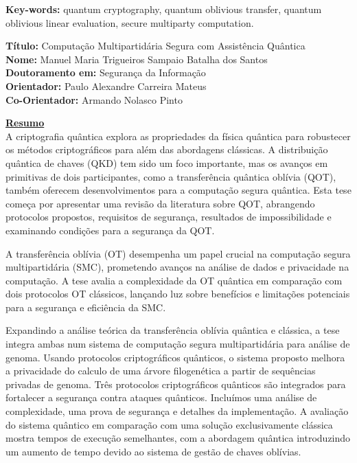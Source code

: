 \documentclass[12pt]{report}
\begin{document}
\vfill

\begin{flushleft}
\textbf{Key-words:} quantum cryptography, quantum oblivious transfer, quantum oblivious
linear evaluation, secure multiparty computation.
\end{flushleft}


\newpage


\noindent \textbf{T\'{i}tulo:} Computa\c{c}\~{a}o Multipartid\'{a}ria Segura com Assist\^{e}ncia Qu\^{a}ntica\\
\textbf{Nome:} Manuel Maria Trigueiros Sampaio Batalha dos Santos\\
\textbf{Doutoramento em:} Seguran\c{c}a da Informa\c{c}\~{a}o\\
\textbf{Orientador:} Paulo Alexandre Carreira Mateus\\
\textbf{Co-Orientador:} Armando Nolasco Pinto\\
\vspace{2\baselineskip}

\underline{\textbf{Resumo}}\\
A criptografia quântica explora as propriedades da física quântica para robustecer os métodos criptográficos para além das abordagens clássicas. A distribuição quântica de chaves (QKD) tem sido um foco importante, mas os avanços em primitivas de dois participantes, como a transferência quântica oblívia (QOT), também oferecem desenvolvimentos para a computação segura quântica. Esta tese começa por apresentar uma revisão da literatura sobre QOT, abrangendo protocolos propostos, requisitos de segurança, resultados de impossibilidade e examinando condições para a segurança da QOT.

A transferência oblívia (OT) desempenha um papel crucial na computação segura multipartidária (SMC), prometendo avanços na análise de dados e privacidade na computação. A tese avalia a complexidade da OT quântica em comparação com dois protocolos OT clássicos, lançando luz sobre benefícios e limitações potenciais para a segurança e eficiência da SMC.

Expandindo a análise teórica da transferência oblívia quântica e clássica, a tese integra ambas num sistema de computação segura multipartidária para análise de genoma. Usando protocolos criptográficos quânticos, o sistema proposto melhora a privacidade do calculo de uma árvore filogenética a partir de sequências privadas de genoma. Três protocolos criptográficos quânticos são integrados para fortalecer a segurança contra ataques quânticos. Incluímos uma análise de complexidade, uma prova de segurança e detalhes da implementação. A avaliação do sistema quântico em comparação com uma solução exclusivamente clássica mostra tempos de execução semelhantes, com a abordagem quântica introduzindo um aumento de tempo devido ao sistema de gestão de chaves oblívias.
\end{document}
